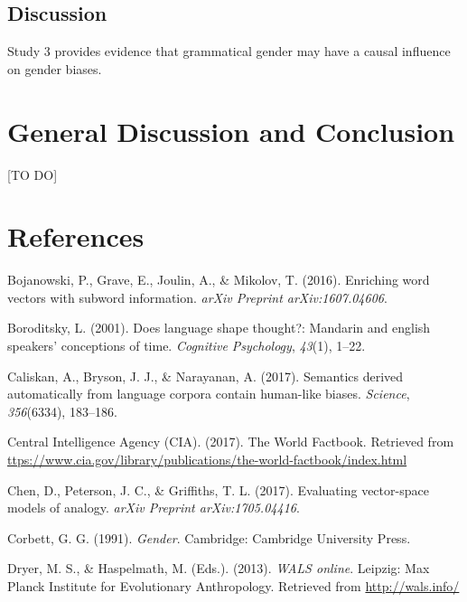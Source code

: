 \documentclass[10pt, letterpaper]{article}
\begin{document}
\subsection{Discussion}\label{discussion-2}

Study 3 provides evidence that grammatical gender may have a causal
influence on gender biases.

\section{General Discussion and
Conclusion}\label{general-discussion-and-conclusion}

{[}TO DO{]}

\section{References}\label{references}

\setlength{\parindent}{-0.1in} \setlength{\leftskip}{0.125in} \noindent

\hypertarget{refs}{}
\hypertarget{ref-bojanowski2016enriching}{}
Bojanowski, P., Grave, E., Joulin, A., \& Mikolov, T. (2016). Enriching
word vectors with subword information. \emph{arXiv Preprint
arXiv:1607.04606}.

\hypertarget{ref-boroditsky2001does}{}
Boroditsky, L. (2001). Does language shape thought?: Mandarin and
english speakers' conceptions of time. \emph{Cognitive Psychology},
\emph{43}(1), 1--22.

\hypertarget{ref-caliskan2017semantics}{}
Caliskan, A., Bryson, J. J., \& Narayanan, A. (2017). Semantics derived
automatically from language corpora contain human-like biases.
\emph{Science}, \emph{356}(6334), 183--186.

\hypertarget{ref-ciafactbook}{}
Central Intelligence Agency (CIA). (2017). The World Factbook. Retrieved
from
\url{ttps://www.cia.gov/library/publications/the-world-factbook/index.html}

\hypertarget{ref-chen2017evaluating}{}
Chen, D., Peterson, J. C., \& Griffiths, T. L. (2017). Evaluating
vector-space models of analogy. \emph{arXiv Preprint arXiv:1705.04416}.

\hypertarget{ref-corbett1991}{}
Corbett, G. G. (1991). \emph{Gender}. Cambridge: Cambridge University
Press.

\hypertarget{ref-wals}{}
Dryer, M. S., \& Haspelmath, M. (Eds.). (2013). \emph{WALS online}.
Leipzig: Max Planck Institute for Evolutionary Anthropology. Retrieved
from \url{http://wals.info/}
\end{document}
